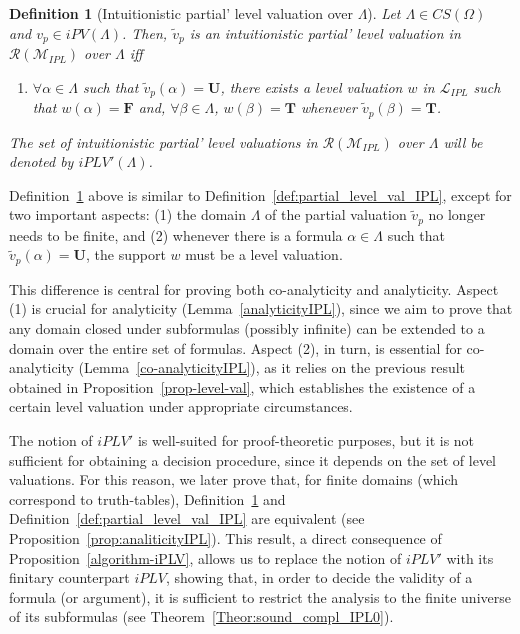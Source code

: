 \documentclass[12pt]{article}
\newtheorem{definition}[theorem]{Definition}
\newcommand{\bT}{\mathbf{T}}
\newcommand{\bU}{\mathbf{U}}
\newcommand{\bF}{\mathbf{F}}
\begin{document}
\begin{definition}[Intuitionistic partial' level valuation over $\Lambda$]\label{def:partial'_level_val_IPL}
    Let $\Lambda \in CS(\Omega)$ and $v_p \in iPV(\Lambda)$. Then, $\tilde v_p$ is an {\em intuitionistic partial' level valuation} in $\mathcal{R}(\mathcal{M}_{IPL})$ over $\Lambda$  iff

    \begin{enumerate}
        \item[] $\forall \alpha \in \Lambda$ such that $\tilde v_p(\alpha) = \bU$, there exists a \emph{level valuation} $w$ in $\mathcal{L}_{IPL}$ such that $w(\alpha) = \bF$ and, $\forall \beta \in \Lambda$, $w(\beta) = \bT$ whenever $\tilde v_p(\beta) = \bT$.
    \end{enumerate}
The set of intuitionistic partial' level valuations in $\mathcal{R}(\mathcal{M}_{IPL})$ over $\Lambda$ will be denoted by $iPLV'(\Lambda)$.
\end{definition}


Definition~\ref{def:partial'_level_val_IPL} above is similar to Definition~\ref{def:partial_level_val_IPL}, except for two important aspects:  
(1) the domain $\Lambda$ of the partial valuation $\tilde v_p$ no longer needs to be finite, and  
(2) whenever there is a formula $\alpha \in \Lambda$ such that $\tilde v_p(\alpha) = \bU$, the support $w$ must be a level valuation.  

This difference is central for proving both co-analyticity and analyticity. Aspect (1) is crucial for analyticity (Lemma~\ref{analyticityIPL}), since we aim to prove that any domain closed under subformulas (possibly infinite) can be extended to a domain over the entire set of formulas. Aspect (2), in turn, is essential for co-analyticity (Lemma~\ref{co-analyticityIPL}), as it relies on the previous result obtained in Proposition~\ref{prop-level-val}, which establishes the existence of a certain level valuation under appropriate circumstances.

The notion of $iPLV'$ is well-suited for proof-theoretic purposes, but it is not sufficient for obtaining a decision procedure, since it depends on the set of level valuations. For this reason, we later prove that, for finite domains (which correspond to truth-tables), Definition~\ref{def:partial'_level_val_IPL} and Definition~\ref{def:partial_level_val_IPL} are equivalent (see Proposition~\ref{prop:analiticityIPL}). This result, a direct consequence of Proposition~\ref{algorithm-iPLV}, allows us to replace the notion of $iPLV'$ with its finitary counterpart $iPLV$, showing that, in order to decide the validity of a formula (or argument), it is sufficient to restrict the analysis to the finite universe of its subformulas (see Theorem~\ref{Theor:sound_compl_IPL0}).
\end{document}
